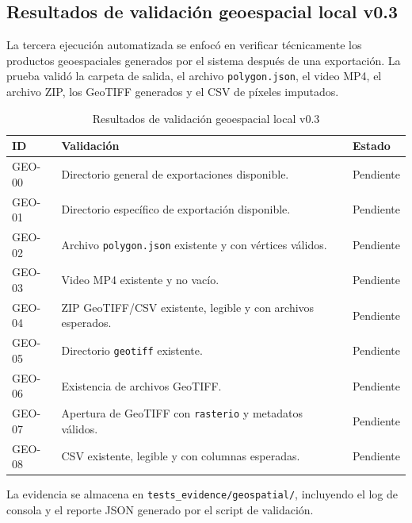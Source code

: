 
\subsection{Resultados de validación geoespacial local v0.3}

La tercera ejecución automatizada se enfocó en verificar técnicamente los productos
geoespaciales generados por el sistema después de una exportación. La prueba validó
la carpeta de salida, el archivo \texttt{polygon.json}, el video MP4, el archivo ZIP,
los GeoTIFF generados y el CSV de píxeles imputados.

\begin{table}[H]
\centering
\begin{tabular}{|p{2.4cm}|p{8.4cm}|p{2.3cm}|}
\hline
\textbf{ID} & \textbf{Validación} & \textbf{Estado} \\
\hline
GEO-00 & Directorio general de exportaciones disponible. & Pendiente \\
\hline
GEO-01 & Directorio específico de exportación disponible. & Pendiente \\
\hline
GEO-02 & Archivo \texttt{polygon.json} existente y con vértices válidos. & Pendiente \\
\hline
GEO-03 & Video MP4 existente y no vacío. & Pendiente \\
\hline
GEO-04 & ZIP GeoTIFF/CSV existente, legible y con archivos esperados. & Pendiente \\
\hline
GEO-05 & Directorio \texttt{geotiff} existente. & Pendiente \\
\hline
GEO-06 & Existencia de archivos GeoTIFF. & Pendiente \\
\hline
GEO-07 & Apertura de GeoTIFF con \texttt{rasterio} y metadatos válidos. & Pendiente \\
\hline
GEO-08 & CSV existente, legible y con columnas esperadas. & Pendiente \\
\hline
\end{tabular}
\caption{Resultados de validación geoespacial local v0.3}
\end{table}

La evidencia se almacena en \texttt{tests\_evidence/geospatial/}, incluyendo el log de
consola y el reporte JSON generado por el script de validación.

